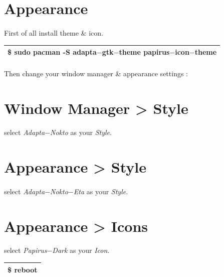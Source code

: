 \documentclass[12pt, a4paper]{article}
\begin{document}
\newpage
\section{Appearance}
\paragraph{}
First of all install theme \& icon.

\begin{center}
	\begin{tabular}{|c|} \hline
	\$ sudo pacman -S adapta$-$gtk$-$theme papirus$-$icon$-$theme\\ \hline
	\end{tabular}
\end{center}


\begin{large}
 \paragraph{}
 Then change your window manager \& appearance settings :
 
 \section*{Window Manager > Style}
 \paragraph{}
 select \emph{Adapta$-$Nokto} as your \emph{Style}. 
 
 \section*{Appearance > Style}
 \paragraph{}
 select \emph{Adapta$-$Nokto$-$Eta} as your \emph{Style}.
 
 \section*{Appearance > Icons}
 \paragraph{}
 select \emph{Papirus$-$Dark} as your \emph{Icon}.\\
 
 \centering
 \begin{tabular}{|c|} \hline
 	\$ reboot\\ \hline
 \end{tabular}
 
\end{large}
\end{document}
